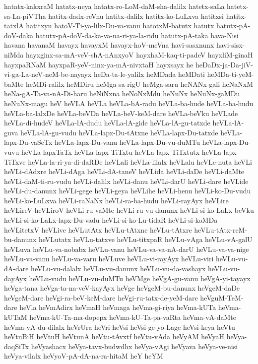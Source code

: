 {hatatx-kakxraM
hatatx-neya
hatatx-ro-LoM-daM-sha-dalilx
hatetx-saLa
hatetx-sa-La-piVTha
hatitx-dadx-reVnu
hatitx-dalilx
hatitx-ko-LuLxva
hatitxsi
hatitx-tatxlA
hatitxyu
hatoV-Ti-ya-lilx-Du-va-vanu
hatotxM-batutx
hatutx
hatutx-pA-doV-daka
hatutx-pA-doV-da-ka-va-na-ri-ya-la-ridu
hatutx-pA-taka
hava-Nisi
havana
havanaM
havayx
havayxM
havayx-hoV-meVna
havi-sasxnunx
havi-sisx-niMda
hayxginx-sa-mA-veV-shA-nAnxyoV
hayxhaM-kaq-ti-padeV
hayxliM-ginaH
hayxpaRNaM
hayxpaR-yeV-ninx-ya-mA-nivxtaH
hayxsayx
he
heDaDx-ja-Da-jiV-vi-ga-La-neV-neM-be-nayayx
heDa-ta-le-yalilx
heMDada
heMDati
heMDa-ti-yeM-baMte
heMDi-ralilx
heMDiru
heMga-sa-rigU
heMga-saru
heNANx-gali
heNaNxM
heNa-gA-Ta-va-nA-Di-haru
heNiNxna
heNoNxMdu
heNuNx
heNuNx-gaMDu
heNuNx-magu
heV
heVLA
heVLa
heVLa-bA-radu
heVLa-ba-hude
heVLa-ba-hudu
heVLa-ba-lalxDe
heVLa-beVDa
heVLa-beV-keM-dare
heVLa-beVku
heVLade
heVLa-di-hudeV
heVLa-lA-dudu
heVLa-lA-gide
heVLa-lA-gu-tatxde
heVLa-lA-guva
heVLa-lA-gu-vudu
heVLa-lapx-Du-tAtxne
heVLa-lapx-Du-tatxde
heVLa-lapx-Du-vaSeTx
heVLa-lapx-Du-vanu
heVLa-lapx-Du-vu-duMTu
heVLa-lapx-Du-vuvu
heVLa-lapxTaTx
heVLa-lapx-TiTxtu
heVLa-lapx-TiTxtutx
heVLa-lapx-TiTxve
heVLa-la-ri-ya-di-daRDe
heVLali
heVLa-lilalx
heVLalu
heVLe-nuta
heVLi
heVLi-dAdxre
heVLi-dAga
heVLi-dA-taneV
heVLida
heVLi-daDe
heVLi-daMte
heVLi-daM-ti-ru-vudu
heVLi-dalilx
heVLi-danu
heVLi-darU
heVLi-dare
heVLide
heVLi-du-danunx
heVLi-gege
heVLi-geya
heVLihe
heVLi-henu
heVLi-ko-Du-vudu
heVLi-ko-LuLxva
heVLi-raNaNx
heVLi-ra-ba-hudu
heVLi-rayAyx
heVLire
heVLireV
heVLiroV
heVLi-ru-vaMte
heVLi-ru-vu-danunx
heVLi-si-ko-LaLx-beVku
heVLi-si-ko-LaLx-lapx-Du-vadu
heVLi-si-ko-Lu-tidaR
heVLi-si-koMDa
heVLitetxV
heVLive
heVLutAtx
heVLu-tAtxne
heVLu-tAtxre
heVLu-tAtx-reM-bu-danunx
heVLutatx
heVLu-tatxve
heVLu-titxpaR
heVLu-vAga
heVLu-vA-galU
heVLuva
heVLu-va-nobabx
heVLu-vanu
heVLu-va-va-nA-darU
heVLu-va-va-nige
heVLu-va-vanu
heVLu-va-varu
heVLuve
heVLu-vi-rayAyx
heVLu-viri
heVLu-vu-dA-dare
heVLu-vu-dalalx
heVLu-vu-danunx
heVLu-vu-da-vashayx
heVLu-vu-dayAyx
heVLu-vudu
heVLu-vu-duMTu
heVMge
heVgA-gu-vanu
heVgA-yi-tayayx
heVga-tana
heVga-ta-na-veV-kayAyx
heVge
heVgeM-bu-danunx
heVgeM-daDe
heVgeM-dare
heVgi-ra-beV-keM-dare
heVgi-ru-tatx-de-yeM-dare
heVguM-TeM-dare
heVla
heVmAdirx
heVmaH
heVmaga
heVma-gi-riya
heVma-kUTa
heVma-kUTaM
heVma-kU-Ta-ma-dopepx
heVma-kU-Ta-pa-vaRta
heVma-vA-daMte
heVma-vA-du-dilalx
heVrUra
heVri
heVsi
heVsi-ge-yo-Lage
heVsi-keya
heVtu
heVtuBiH
heVtuH
heVtunA
heVtu-tAvxtf
heVtu-vAda
heVyAM
heVyaH
heVya-daqSiTx
heVyashacx
heVya-tavx-budwdhx
heVya-vAgi
heVyava
heVya-ve-nisi
heVya-vilalx
heVyoV-pA-dA-na-ra-hitaM
heY
heYM
}
